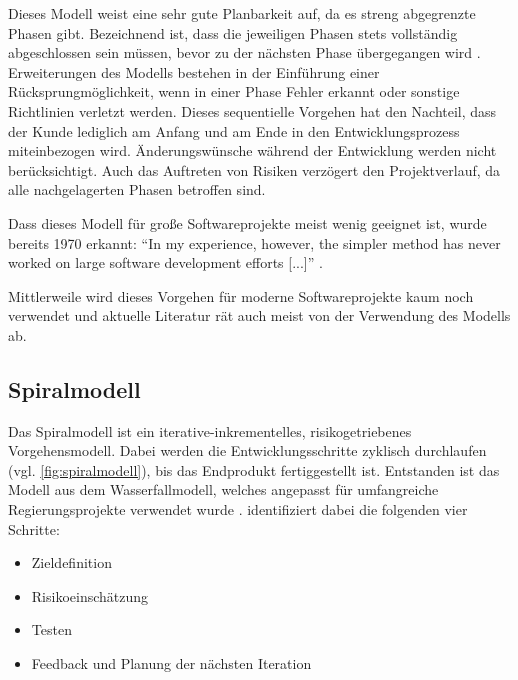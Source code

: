 Dieses Modell weist eine sehr gute Planbarkeit auf, da es streng abgegrenzte Phasen gibt. 
Bezeichnend ist, dass die jeweiligen Phasen stets vollständig abgeschlossen sein müssen, bevor zu der nächsten Phase übergegangen wird \parencite[Vgl.][S. 48]{Schatten:2010aa}.
Erweiterungen des Modells bestehen in der Einführung einer Rücksprungmöglichkeit, wenn in einer Phase Fehler erkannt oder sonstige Richtlinien verletzt werden.
Dieses sequentielle Vorgehen hat den Nachteil, dass der Kunde lediglich am Anfang und am Ende in den Entwicklungsprozess miteinbezogen wird.
Änderungswünsche während der Entwicklung werden nicht berücksichtigt.
Auch das Auftreten von Risiken verzögert den Projektverlauf, da alle nachgelagerten Phasen betroffen sind.

Dass dieses Modell für große Softwareprojekte meist wenig geeignet ist, wurde bereits 1970 erkannt: \enquote{In my experience, however, the simpler method has never worked on large software development efforts [...]} \parencite[][]{Royce:1970aa}.

Mittlerweile wird dieses Vorgehen für moderne Softwareprojekte kaum noch verwendet und aktuelle Literatur rät auch meist von der Verwendung des Modells ab.
\parencite[Vgl.][S. 49]{Schatten:2010aa}

\subsection{Spiralmodell}

Das Spiralmodell ist ein iterative-inkrementelles, risikogetriebenes Vorgehensmodell.
Dabei werden die Entwicklungsschritte zyklisch durchlaufen (vgl. \autoref{fig:spiralmodell}), bis das Endprodukt fertiggestellt ist.
Entstanden ist das Modell aus dem Wasserfallmodell, welches angepasst für umfangreiche Regierungsprojekte verwendet wurde \parencite[][]{Boehm:1988aa}.
\parencite[][S. 57]{Schatten:2010aa} identifiziert dabei die folgenden vier Schritte:

\begin{itemize}
\item Zieldefinition
\item Risikoeinschätzung
\item Testen
\item Feedback und Planung der nächsten Iteration
\end{itemize}

